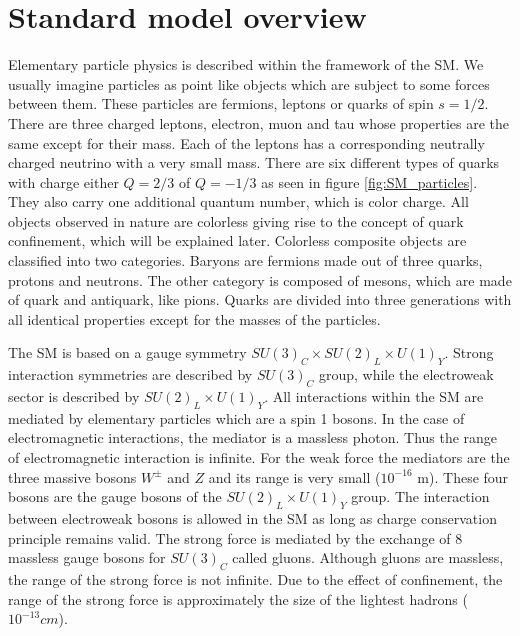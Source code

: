 
\section{Standard model overview}

\par Elementary particle physics is described within the framework of the SM. We usually imagine particles as point like objects which are subject to some forces between them. These particles are fermions, leptons or quarks of spin $s=1/2$. There are three charged leptons, electron, muon and tau whose properties are the same except for their mass. Each of the leptons has a corresponding neutrally charged neutrino with a very small mass. There are six different types of quarks with charge either $Q=2/3$ of $Q=-1/3$ as seen in figure \ref{fig:SM_particles}. They also carry one additional quantum number, which is color charge. All objects observed in nature are colorless giving rise to the concept of quark confinement, which will be explained later. Colorless composite objects are classified into two categories. Baryons are fermions made out of three  quarks, protons and neutrons. The other category is composed of mesons, which are made of quark and antiquark, like pions. Quarks are divided into three generations with all identical properties except for the masses of the particles. 
\par The SM is based on a gauge symmetry $SU(3)_C \times SU(2)_L \times U(1)_Y$. Strong interaction symmetries are described by $SU(3)_C$ group, while the electroweak sector is described by $SU(2)_L \times U(1)_Y$. All interactions within the SM are mediated by elementary particles which are a spin 1 bosons. In the case of electromagnetic interactions, the mediator is a massless photon. Thus the range of electromagnetic interaction is infinite. For the weak force the mediators are the three massive bosons $W^{\pm}$ and $Z$ and its range is very small ($10^{-16}$ m). These four bosons are the gauge bosons of the $SU(2)_L \times U(1)_Y$ group. The interaction between electroweak bosons is allowed in the SM as long as charge conservation principle remains valid. The strong force is mediated by the exchange of 8 massless gauge bosons for $SU(3)_C$ called gluons. Although gluons are massless, the range of the strong force is not infinite. Due to the effect of confinement, the range of the strong force is approximately the size of the lightest hadrons ($10^{-13} cm$). 

